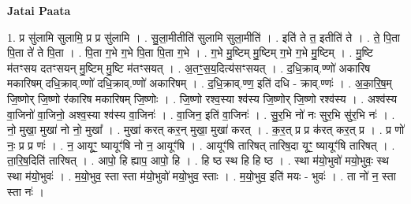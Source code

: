 \documentclass[17pt]{extarticle}
\begin{document}
\textbf{Jatai Paata} \newline

1. प्र सु॑लामि सुलामि॒ प्र प्र सु॑लामि । . सु॒ला॒मीतीति॑ सुलामि सुला॒मीति॑ । . इति॑ ते त॒ इतीति॑ ते । . ते॒ पि॒ता पि॒ता ते॑ ते पि॒ता । . पि॒ता ग॒भे ग॒भे पि॒ता पि॒ता ग॒भे । . ग॒भे मु॒ष्टिम् मु॒ष्टिम् ग॒भे ग॒भे मु॒ष्टिम् । . मु॒ष्टि म॑तꣳसय दतꣳसयन् मु॒ष्टिम् मु॒ष्टि म॑तꣳसयत् । . अ॒तꣳ॒॒स॒य॒दित्य॑सꣳसयत् । . द॒धि॒क्राव्.ण्णो॑ अकारिष मकारिषम् दधि॒क्राव्.ण्णो॑ दधि॒क्राव्.ण्णो॑ अकारिषम् । . द॒धि॒क्राव्.ण्ण॒ इति॑ दधि - क्राव्.ण्णः॑ । . अ॒का॒रि॒ष॒म् जि॒ष्णोर् जि॒ष्णो र॑कारिष मकारिषम् जि॒ष्णोः । . जि॒ष्णो रश्व॒स्या श्व॑स्य जि॒ष्णोर् जि॒ष्णो रश्व॑स्य । . अश्व॑स्य वा॒जिनो॑ वा॒जिनो॒ अश्व॒स्या श्व॑स्य वा॒जिनः॑ । . वा॒जिन॒ इति॑ वा॒जिनः॑ । . सु॒र॒भि नो॑ नः सुर॒भि सु॑र॒भि नः॑ । . नो॒ मुखा॒ मुखा॑ नो नो॒ मुखा᳚ । . मुखा॑ करत् कर॒न् मुखा॒ मुखा॑ करत् । . क॒र॒त् प्र प्र क॑रत् कर॒त् प्र । . प्र णो॑ नः॒ प्र प्र णः॑ । . न॒ आयूꣳ॒॒ ष्यायूꣳ॑षि नो न॒ आयूꣳ॑षि । . आयूꣳ॑षि तारिषत् तारिष॒दा यूꣳ॒॒ ष्यायूꣳ॑षि तारिषत् । . ता॒रि॒ष॒दिति॑ तारिषत् । . आपो॒ हि ह्याप॒ आपो॒ हि । . हि ष्ठ स्थ हि हि ष्ठ । . स्था म॑यो॒भुवो॑ मयो॒भुवः॒ स्थ स्था म॑यो॒भुवः॑ । . म॒यो॒भुव॒ स्ता स्ता म॑यो॒भुवो॑ मयो॒भुव॒ स्ताः । . म॒यो॒भुव॒ इति॑ मयः - भुवः॑ । . ता नो॑ न॒ स्ता स्ता नः॑ । \newline
\end{document}
